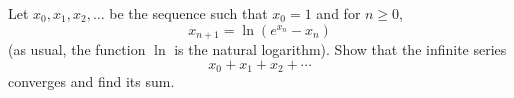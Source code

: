 Let $x_0,x_1,x_2,\dots$ be the sequence such that $x_0=1$ and for $n \geq 0$,
\[
x_{n+1} = \ln(e^{x_n} - x_n)
\]
(as usual, the function $\ln$ is the natural logarithm). Show that the infinite series
\[
x_0 + x_1 + x_2 + \cdots
\]
converges and find its sum.
